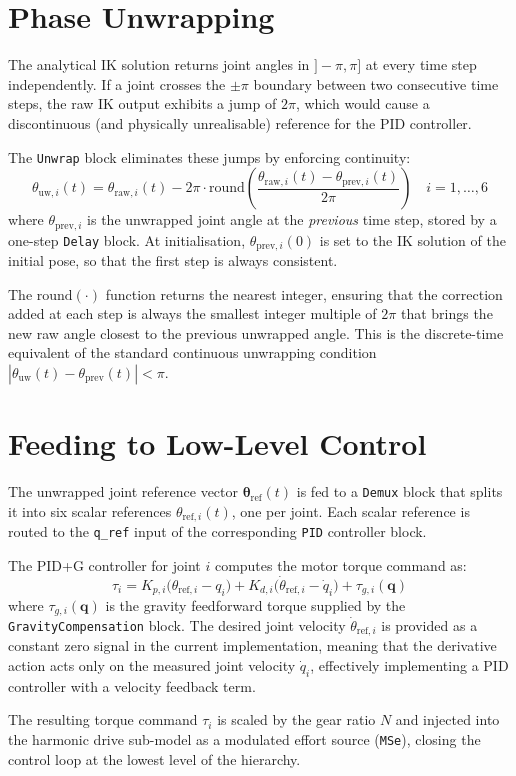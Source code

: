 \section{Phase Unwrapping}

The analytical IK solution returns joint angles in $]-\pi, \pi]$ at every time step independently.
If a joint crosses the $\pm\pi$ boundary between two consecutive time steps, the raw IK output exhibits a jump of $2\pi$, which would cause a discontinuous (and physically unrealisable) reference for the PID controller.

The \texttt{Unwrap} block eliminates these jumps by enforcing continuity:
\begin{equation}
  \theta_{\text{uw},i}(t) = \theta_{\text{raw},i}(t) - 2\pi \cdot \text{round}\!\left(\frac{\theta_{\text{raw},i}(t) - \theta_{\text{prev},i}(t)}{2\pi}\right) \quad i = 1,\ldots,6
\end{equation}
where $\theta_{\text{prev},i}$ is the unwrapped joint angle at the \emph{previous} time step, stored by a one-step \texttt{Delay} block.
At initialisation, $\theta_{\text{prev},i}(0)$ is set to the IK solution of the initial pose, so that the first step is always consistent.

The $\text{round}(\cdot)$ function returns the nearest integer, ensuring that the correction added at each step is always the smallest integer multiple of $2\pi$ that brings the new raw angle closest to the previous unwrapped angle.
This is the discrete-time equivalent of the standard continuous unwrapping condition $|\theta_{\text{uw}}(t) - \theta_{\text{prev}}(t)| < \pi$.

\section{Feeding to Low-Level Control}

The unwrapped joint reference vector $\boldsymbol{\theta}_{\text{ref}}(t)$ is fed to a \texttt{Demux} block that splits it into six scalar references $\theta_{\text{ref},i}(t)$, one per joint.
Each scalar reference is routed to the \texttt{q\_ref} input of the corresponding \texttt{PID} controller block.

The PID+G controller for joint $i$ computes the motor torque command as:
\begin{equation}
  \tau_i = K_{p,i}\bigl(\theta_{\text{ref},i} - q_i\bigr)
         + K_{d,i}\bigl(\dot{\theta}_{\text{ref},i} - \dot{q}_i\bigr)
         + \tau_{g,i}(\mathbf{q})
\end{equation}
where $\tau_{g,i}(\mathbf{q})$ is the gravity feedforward torque supplied by the \texttt{GravityCompensation} block.
The desired joint velocity $\dot{\theta}_{\text{ref},i}$ is provided as a constant zero signal in the current implementation, meaning that the derivative action acts only on the measured joint velocity $\dot{q}_i$, effectively implementing a PID controller with a velocity feedback term.

The resulting torque command $\tau_i$ is scaled by the gear ratio $N$ and injected into the harmonic drive sub-model as a modulated effort source (\texttt{MSe}), closing the control loop at the lowest level of the hierarchy.